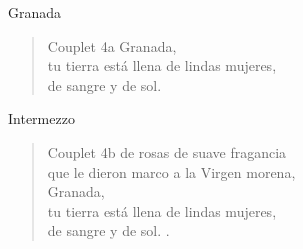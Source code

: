 \begin{song}[vals]{Granada}
\begin{verse}{Couplet 4a}
Granada,\\
\chord{\_\_\_\_\_\_\_\_\_\_\_\_}tu tierra está llena de lindas mujeres,\\
de sangre y de sol.\\
\end{verse}
\clearpage
\begin{instrumental}{Intermezzo}
\measure*{}\measure{}\measure{}
\end{instrumental}

\begin{verse}{Couplet 4b}
de rosas de suave fragancia\\
que le dieron marco a la Virgen morena, \hspace{2em} \\
Granada,\\
\chord{\_\_\_\_\_\_\_\_\_\_\_\_}tu tierra está llena de lindas mujeres,\\
de sangre y de sol.  \hspace{2em} \hspace{2em} \hspace{2em} .\\
\end{verse}

\end{song}

